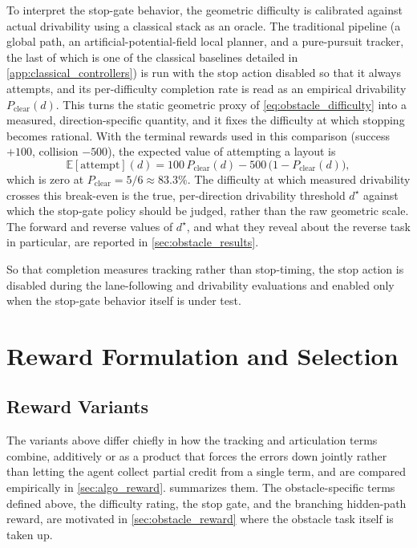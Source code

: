 To interpret the stop-gate behavior, the geometric difficulty is calibrated against actual drivability using a classical stack as an oracle. The traditional pipeline (a global path, an artificial-potential-field local planner, and a pure-pursuit tracker, the last of which is one of the classical baselines detailed in \cref{app:classical_controllers}) is run with the stop action disabled so that it always attempts, and its per-difficulty completion rate is read as an empirical drivability $P_{\mathrm{clear}}(d)$. This turns the static geometric proxy of \cref{eq:obstacle_difficulty} into a measured, direction-specific quantity, and it fixes the difficulty at which stopping becomes rational. With the terminal rewards used in this comparison (success $+100$, collision $-500$), the expected value of attempting a layout is
\begin{equation}
\mathbb{E}[\mathrm{attempt}](d) = 100\,P_{\mathrm{clear}}(d) - 500\,\bigl(1 - P_{\mathrm{clear}}(d)\bigr),
\label{eq:attempt_ev}
\end{equation}
which is zero at $P_{\mathrm{clear}} = 5/6 \approx 83.3\%$. The difficulty at which measured drivability crosses this break-even is the true, per-direction drivability threshold $d^\star$ against which the stop-gate policy should be judged, rather than the raw geometric scale. The forward and reverse values of $d^\star$, and what they reveal about the reverse task in particular, are reported in \cref{sec:obstacle_results}.

So that completion measures tracking rather than stop-timing, the stop action is disabled during the lane-following and drivability evaluations and enabled only when the stop-gate behavior itself is under test.

\section{Reward Formulation and Selection}

\subsection{Reward Variants}


The variants above differ chiefly in how the tracking and articulation terms combine, additively or as a product that forces the errors down jointly rather than letting the agent collect partial credit from a single term, and are compared empirically in \cref{sec:algo_reward}.  summarizes them. The obstacle-specific terms defined above, the difficulty rating, the stop gate, and the branching hidden-path reward, are motivated in \cref{sec:obstacle_reward} where the obstacle task itself is taken up.

